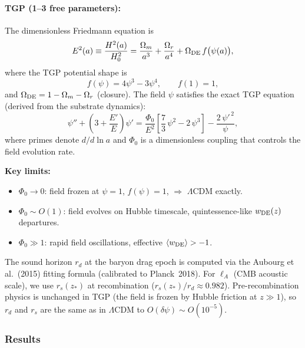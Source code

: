 \paragraph{TGP (1--3 free parameters):}
The dimensionless Friedmann equation is
\begin{equation}\label{eq:E2-tgp}
  E^2(a) \equiv \frac{H^2(a)}{H_0^2}
  = \frac{\Omega_m}{a^3} + \frac{\Omega_r}{a^4}
    + \Omega_{\rm DE}\,f\bigl(\psi(a)\bigr),
\end{equation}
where the TGP potential shape is
\begin{equation}\label{eq:f-pot}
  f(\psi) = 4\psi^3 - 3\psi^4, \qquad f(1) = 1,
\end{equation}
and $\Omega_{\rm DE} = 1 - \Omega_m - \Omega_r$ (closure).
The field $\psi$ satisfies the exact TGP equation
(derived from the substrate dynamics):
\begin{equation}\label{eq:tgp-field-cosmo}
  \psi'' + \left(3 + \frac{E'}{E}\right)\psi'
  = \frac{\Phi_0}{E^2}\left[\frac{7}{3}\,\psi^2 - 2\,\psi^3\right]
    - \frac{2\,\psi'^{\,2}}{\psi},
\end{equation}
where primes denote $d/d\ln a$ and $\Phi_0$ is a dimensionless
coupling that controls the field evolution rate.

\medskip\noindent
\textbf{Key limits:}
\begin{itemize}[nosep]
  \item $\Phi_0 \to 0$: field frozen at $\psi = 1$,
        $f(\psi) = 1$, $\Rightarrow$ $\Lambda$CDM exactly.
  \item $\Phi_0 \sim O(1)$: field evolves on Hubble timescale,
        quintessence-like $w_{\rm DE}(z)$ departures.
  \item $\Phi_0 \gg 1$: rapid field oscillations,
        effective $\langle w_{\rm DE} \rangle > -1$.
\end{itemize}

The sound horizon $r_d$ at the baryon drag epoch is computed via
the Aubourg et al.\ (2015) fitting formula (calibrated to Planck~2018).
For $\ell_A$ (CMB acoustic scale), we use $r_s(z_*)$ at
recombination ($r_s(z_*)/r_d \approx 0.982$).
Pre-recombination physics is unchanged in TGP (the field is frozen
by Hubble friction at $z \gg 1$), so $r_d$ and $r_s$ are the same
as in $\Lambda$CDM to $O(\delta\psi) \sim O(10^{-5})$.

\subsubsection{Results}

